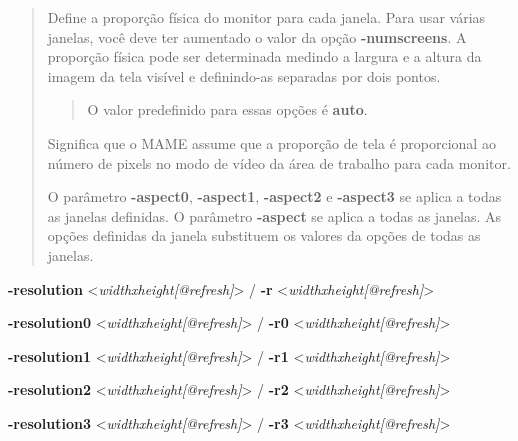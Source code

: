\documentclass[letterpaper,10pt,brazil]{sphinxmanual}
\begin{document}
\begin{quote}

Define a proporção física do monitor para cada janela. Para usar
várias janelas, você deve ter aumentado o valor da opção
\textbf{-numscreens}.
A proporção física pode ser determinada medindo a largura e a altura
da imagem da tela visível e definindo-as separadas por dois pontos.
\begin{quote}

O valor predefinido para essas opções é \textbf{auto}.
\end{quote}

Significa que o MAME assume que a proporção de tela é proporcional
ao número de pixels no modo de vídeo da área de trabalho para cada
monitor.

O parâmetro \textbf{-aspect0}, \textbf{-aspect1}, \textbf{-aspect2} e \textbf{-aspect3}
se aplica a todas as janelas definidas. O parâmetro \textbf{-aspect} se
aplica a todas as janelas.
As opções definidas da janela substituem os valores da opções de
todas as janelas.
\end{quote}
\label{commandline/commandline-all:mame-commandline-resolution}
\begin{DUlineblock}{0em}
\item[] \textbf{-resolution} \textless{}\emph{widthxheight{[}@refresh{]}}\textgreater{} / \textbf{-r} \textless{}\emph{widthxheight{[}@refresh{]}}\textgreater{}
\item[] \textbf{-resolution0} \textless{}\emph{widthxheight{[}@refresh{]}}\textgreater{} / \textbf{-r0} \textless{}\emph{widthxheight{[}@refresh{]}}\textgreater{}
\item[] \textbf{-resolution1} \textless{}\emph{widthxheight{[}@refresh{]}}\textgreater{} / \textbf{-r1} \textless{}\emph{widthxheight{[}@refresh{]}}\textgreater{}
\item[] \textbf{-resolution2} \textless{}\emph{widthxheight{[}@refresh{]}}\textgreater{} / \textbf{-r2} \textless{}\emph{widthxheight{[}@refresh{]}}\textgreater{}
\item[] \textbf{-resolution3} \textless{}\emph{widthxheight{[}@refresh{]}}\textgreater{} / \textbf{-r3} \textless{}\emph{widthxheight{[}@refresh{]}}\textgreater{}
\end{DUlineblock}
\end{document}
